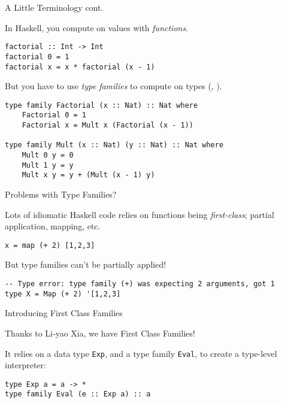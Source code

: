 \documentclass{beamer}
\newcommand{\inline}[1]{\lstinline[basicstyle=\ttfamily]{#1}}
\begin{document}
\begin{frame}[fragile]{A Little Terminology cont.}

In Haskell, you compute on values with \emph{functions}.

\begin{lstlisting}
factorial :: Int -> Int
factorial 0 = 1
factorial x = x * factorial (x - 1)
\end{lstlisting}

\pause

But you have to use \emph{type families} to compute on types (\cite{opentfs}, \cite{closedtfs}).

\begin{lstlisting}
type family Factorial (x :: Nat) :: Nat where
    Factorial 0 = 1
    Factorial x = Mult x (Factorial (x - 1))
    
type family Mult (x :: Nat) (y :: Nat) :: Nat where
    Mult 0 y = 0
    Mult 1 y = y
    Mult x y = y + (Mult (x - 1) y)
\end{lstlisting}

\end{frame}

\begin{frame}[fragile]{Problems with Type Families?}

Lots of idiomatic Haskell code relies on functions being \emph{first-class}; partial application, mapping, etc.

\begin{lstlisting}
x = map (+ 2) [1,2,3]
\end{lstlisting}

\pause

But type families can't be partially applied!

\begin{lstlisting}
-- Type error: type family (+) was expecting 2 arguments, got 1
type X = Map (+ 2) '[1,2,3]
\end{lstlisting}
    
\end{frame}

\begin{frame}[fragile]{Introducing First Class Families}

Thanks to Li-yao Xia, we have First Class Families!

It relies on a data type \inline{Exp}, and a type family \inline{Eval}, to create a type-level interpreter:

\begin{lstlisting}
type Exp a = a -> *
type family Eval (e :: Exp a) :: a
\end{lstlisting}


\end{frame}
\end{document}
